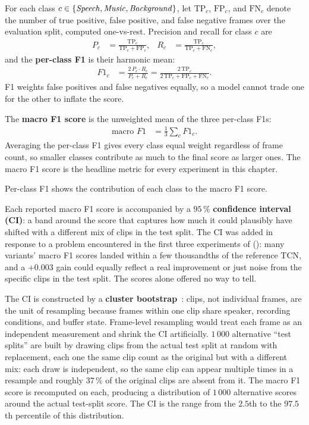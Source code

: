 For each class $c \in \{\text{\emph{Speech}}, \text{\emph{Music}}, \text{\emph{Background}}\}$, let $\mathrm{TP}_c$, $\mathrm{FP}_c$, and $\mathrm{FN}_c$ denote the number of true positive, false positive, and false negative frames over the evaluation split, computed one-vs-rest.
Precision and recall for class $c$ are
\begin{align}
\label{eq:precision_recall}
P_c &= \frac{\mathrm{TP}_c}{\mathrm{TP}_c + \mathrm{FP}_c}, &
R_c &= \frac{\mathrm{TP}_c}{\mathrm{TP}_c + \mathrm{FN}_c},
\end{align}
and the \textbf{per-class F1} is their harmonic mean:
\begin{align}
\label{eq:f1_class}
F1_c &= \frac{2\, P_c \cdot R_c}{P_c + R_c} = \frac{2\, \mathrm{TP}_c}{2\, \mathrm{TP}_c + \mathrm{FP}_c + \mathrm{FN}_c}.
\end{align}
F1 weights false positives and false negatives equally, so a model cannot trade one for the other to inflate the score.

The \textbf{macro F1 score} is the unweighted mean of the three per-class F1s:
\begin{align}
\label{eq:macro_f1}
\text{macro }F1 &= \frac{1}{3} \sum_{c} F1_c.
\end{align}
Averaging the per-class F1 gives every class equal weight regardless of frame count, so smaller classes contribute as much to the final score as larger ones.
The macro F1 score is the headline metric for every experiment in this chapter.

Per-class F1 shows the contribution of each class to the macro F1 score.

Each reported macro F1 score is accompanied by a $95\,\%$ \textbf{confidence interval (CI)}: a band around the score that captures how much it could plausibly have shifted with a different mix of clips in the test split.
The CI was added in response to a problem encountered in the first three experiments of  (): many variants' macro F1 scores landed within a few thousandths of the reference TCN, and a $+0.003$ gain could equally reflect a real improvement or just noise from the specific clips in the test split.
The scores alone offered no way to tell.

The CI is constructed by a \textbf{cluster bootstrap}~\cite{efron1979bootstrap,davison1997bootstrap}: clips, not individual frames, are the unit of resampling because frames within one clip share speaker, recording conditions, and buffer state.
Frame-level resampling would treat each frame as an independent measurement and shrink the CI artificially.
$1\,000$ alternative ``test splits'' are built by drawing clips from the actual test split at random with replacement, each one the same clip count as the original but with a different mix: each draw is independent, so the same clip can appear multiple times in a resample and roughly $37\,\%$ of the original clips are absent from it.
The macro F1 score is recomputed on each, producing a distribution of $1\,000$ alternative scores around the actual test-split score.
The CI is the range from the $2.5$th to the $97.5$th percentile of this distribution.

